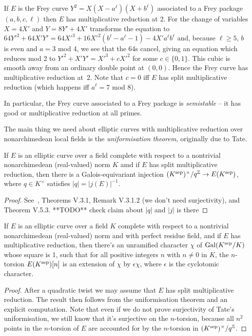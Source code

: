 \begin{example} If $E$ is the Frey curve $Y^2=X(X-a^\ell)(X+b^\ell)$ associated to a Frey package
  $(a,b,c,\ell)$ then $E$ has multiplicative reduction at 2. For the change of variables $X=4X'$ 
  and $Y=8Y'+4X'$ transforms the equation to 
  $64Y'^2+64X'Y'=64X'^3+16X'^2(b^\ell-a^\ell-1)-4X'a^\ell b^\ell$ and, because $\ell\geq5$,
  $b$ is even and $a=3$ mod 4, we see that the 64s cancel, giving an equation which reduces mod 2 to
  $Y'^2+X'Y'=X'^3+cX'^2$ for some $c\in\{0,1\}$. This cubic is smooth away from an ordinary 
  double point at $(0,0)$. Hence the Frey curve has multiplicative reduction at~2. Note
  that $c=0$ iff $E$ has split multiplicative reduction (which happens iff $a^\ell=7$ mod $8$).
\end{example}

In particular, the Frey curve associated to a Frey package is \emph{semistable} -- it has good or
 multiplicative reduction at all primes.

The main thing we need about elliptic curves with multiplicative reduction over nonarchimedean
local fields is the \emph{uniformisation theorem}, originally due to Tate. 

\begin{theorem}\label{Tate_curve_uniformisation} If $E$ is an elliptic curve over a field
  complete with respect to a nontrivial nonarchimedean (real-valued) norm $K$ amd if $E$ has split
  multiplicative reduction, then there is a Galois-equivariant injection
  $(K^{\operatorname{sep}})^\times/q^{\mathbb{Z}}\to E(K^{\operatorname{sep}})$, where $q\in K^\times$ satisfies
  $|q|=|j(E)|^{-1}$.
\end{theorem}
\begin{proof}
  See~\cite{silverman2}, Theorems V.3.1, Remark V.3.1.2 (we don't need surjectivity),
  and Theorem V.5.3. {**TODO** check claim about $|q|$ and $|j|$ is there}
\end{proof}

\begin{corollary}\label{multiplicative_reduction_torsion} If $E$ is an elliptic curve
  over a field $K$ complete with respect to a nontrivial nonarchimedean (real-valued) norm
  and with perfect residue field, and if $E$ has multiplicative reduction, then there's
  an unramified character $\chi$ of $\operatorname{Gal}(K^{\operatorname{sep}}/K)$ whose square is 1, such that for
  all positive integers $n$ with $n\not=0$ in $K$, the 
  $n$-torsion $E(K^{\operatorname{sep}})[n]$ is an extension of $\chi$ by $\epsilon\chi$, where $\epsilon$ is the
  cyclotomic character.
\end{corollary}
\begin{proof} After a quadratic twist we may assume that $E$ has split multiplicative reduction.
  The result then follows from the uniformisation theorem and an explicit computation.
  Note that even if we do not prove surjectivity of Tate's uniformisation, we still know
  that it's surjective on the $n$-torsion, because all $n^2$ points in the $n$-torsion of $E$
  are accounted for by the $n$-torsion in $(K^{\operatorname{sep}})^\times/q^{\mathbb{Z}}$.
\end{proof}

